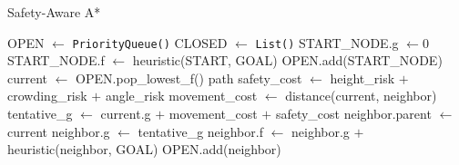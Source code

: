 \documentclass{article}
\begin{document}
\setcounter{algorithm}{1}

\begin{algorithm}
\caption{Safety-Aware A*}
\begin{algorithmic}[1]
    \State OPEN $\gets$ \texttt{PriorityQueue()}
    \State CLOSED $\gets$ \texttt{List()}
    \State START\_NODE.g $\gets 0$
    \State START\_NODE.f $\gets$ heuristic(START, GOAL)
    \State OPEN.add(START\_NODE)
        \State current $\gets$ OPEN.pop\_lowest\_f()
            \State \Return path
        \EndIf
            \State safety\_cost $\gets$ height\_risk $+$ crowding\_risk $+$ angle\_risk
            \State movement\_cost $\gets$ distance(current, neighbor)
            \State tentative\_g $\gets$ current.g $+$ movement\_cost $+$ safety\_cost
                \State neighbor.parent $\gets$ current
                \State neighbor.g $\gets$ tentative\_g
                \State neighbor.f $\gets$ neighbor.g $+$ heuristic(neighbor, GOAL)
                \State OPEN.add(neighbor)
            \EndIf
        \EndFor
    \EndWhile
\end{algorithmic}
\end{algorithm}
\end{document}
